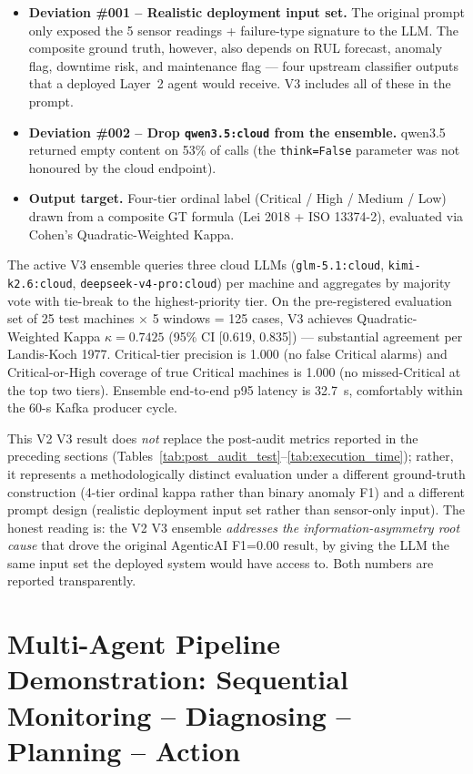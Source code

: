 \begin{itemize}
    \item \textbf{Deviation \#001 -- Realistic deployment input set.} The original prompt only exposed the 5 sensor readings + failure-type signature to the LLM. The composite ground truth, however, also depends on RUL forecast, anomaly flag, downtime risk, and maintenance flag --- four upstream classifier outputs that a deployed Layer~2 agent would receive. V3 includes all of these in the prompt.
    \item \textbf{Deviation \#002 -- Drop \texttt{qwen3.5:cloud} from the ensemble.} qwen3.5 returned empty content on 53\% of calls (the \texttt{think=False} parameter was not honoured by the cloud endpoint).
    \item \textbf{Output target.} Four-tier ordinal label (Critical / High / Medium / Low) drawn from a composite GT formula (Lei 2018 + ISO 13374-2), evaluated via Cohen's Quadratic-Weighted Kappa.
\end{itemize}

The active V3 ensemble queries three cloud LLMs (\texttt{glm-5.1:cloud}, \texttt{kimi-k2.6:cloud}, \texttt{deepseek-v4-pro:cloud}) per machine and aggregates by majority vote with tie-break to the highest-priority tier. On the pre-registered evaluation set of 25 test machines $\times$ 5 windows = 125 cases, V3 achieves Quadratic-Weighted Kappa \textbf{$\kappa = 0.7425$} (95\% CI [0.619, 0.835]) --- substantial agreement per Landis-Koch 1977. Critical-tier precision is 1.000 (no false Critical alarms) and Critical-or-High coverage of true Critical machines is 1.000 (no missed-Critical at the top two tiers). Ensemble end-to-end p95 latency is 32.7~s, comfortably within the 60-s Kafka producer cycle.

This V2 V3 result does \emph{not} replace the post-audit metrics reported in the preceding sections (Tables~\ref{tab:post_audit_test}--\ref{tab:execution_time}); rather, it represents a methodologically distinct evaluation under a different ground-truth construction (4-tier ordinal kappa rather than binary anomaly F1) and a different prompt design (realistic deployment input set rather than sensor-only input). The honest reading is: the V2 V3 ensemble \emph{addresses the information-asymmetry root cause} that drove the original AgenticAI F1=0.00 result, by giving the LLM the same input set the deployed system would have access to. Both numbers are reported transparently.

\section{Multi-Agent Pipeline Demonstration: Sequential Monitoring -- Diagnosing -- Planning -- Action}
\label{sec:multi_agent_pipeline_demo}

